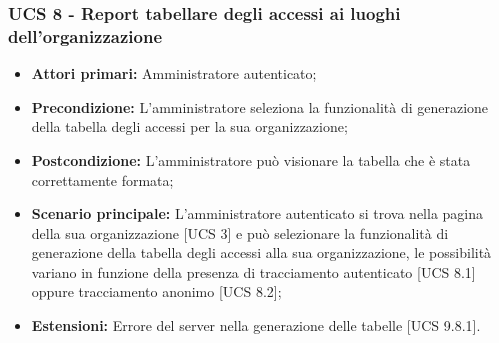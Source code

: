 \subsubsection{UCS 8 - Report tabellare degli accessi ai luoghi dell'organizzazione}%
\begin{itemize}
\item \textbf{Attori primari:} Amministratore autenticato;
\item \textbf{Precondizione:} L'amministratore seleziona la funzionalità di generazione della tabella degli accessi per la sua organizzazione;
\item \textbf{Postcondizione:} L'amministratore può visionare la tabella che è stata correttamente formata;
\item \textbf{Scenario principale:} L'amministratore autenticato si trova nella pagina della sua organizzazione [UCS 3] e può selezionare la funzionalità di generazione della tabella degli accessi alla sua organizzazione, le possibilità variano in funzione della presenza di tracciamento autenticato [UCS 8.1] oppure tracciamento anonimo [UCS 8.2];
\item \textbf{Estensioni:} Errore del server nella generazione delle tabelle [UCS 9.8.1].
\end{itemize}

